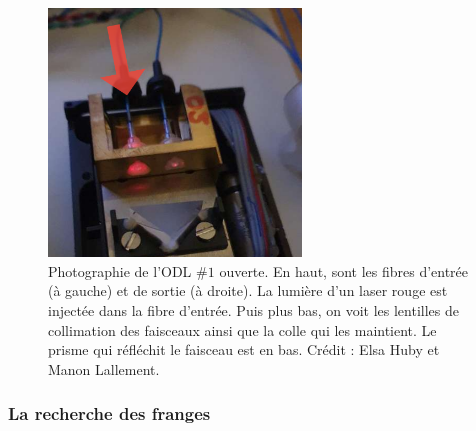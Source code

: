 \begin{figure}[ht!]
    \centering
    \includegraphics[width=0.6\textwidth]{Figure_Chap2/ODL_Inside_LightInjected_02.png}
    \caption[Photographie d'une ODL ouverte.]{Photographie de l'ODL $\#1$ ouverte. En haut, sont les fibres d'entrée (à gauche) et de sortie (à droite). La lumière d'un laser rouge est injectée dans la fibre d'entrée. Puis plus bas, on voit les lentilles de collimation des faisceaux ainsi que la colle qui les maintient. Le prisme qui réfléchit le faisceau est en bas. Crédit : Elsa Huby et Manon Lallement.}
    \label{fig:ODLOpened}
\end{figure}


\subsubsection{La recherche des franges}

